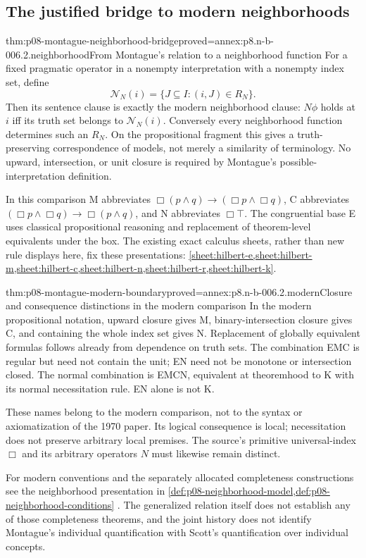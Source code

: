 \subsection{The justified bridge to modern neighborhoods}

\begin{hbtheorem}{thm:p08-montague-neighborhood-bridge}{proved=annex:p8.n-b-006.2.neighborhood}{From Montague's relation to a neighborhood function}
For a fixed pragmatic operator in a nonempty interpretation with a
nonempty index set, define
\[
 \mathcal N_N(i)=\{J\subseteq I:(i,J)\in R_N\}.
\]
Then its sentence clause is exactly the modern neighborhood clause:
\(N\phi\) holds at \(i\) iff its truth set belongs to
\(\mathcal N_N(i)\). Conversely every neighborhood function determines
such an \(R_N\). On the propositional fragment this gives a
truth-preserving correspondence of models, not merely a similarity
of terminology. No upward, intersection, or unit closure is required
by Montague's possible-interpretation definition.
\end{hbtheorem}

In this comparison M abbreviates
\(\Box(p\land q)\to(\Box p\land\Box q)\), C abbreviates
\((\Box p\land\Box q)\to\Box(p\land q)\), and N abbreviates
\(\Box\top\). The congruential base E uses classical propositional
reasoning and replacement of theorem-level equivalents under the box.
The existing exact calculus sheets, rather than new rule displays here,
fix these presentations:
\cref{sheet:hilbert-e,sheet:hilbert-m,sheet:hilbert-c,sheet:hilbert-n,sheet:hilbert-r,sheet:hilbert-k}.

\begin{hbtheorem}{thm:p08-montague-modern-boundary}{proved=annex:p8.n-b-006.2.modern}{Closure and consequence distinctions in the modern comparison}
In the modern propositional notation, upward closure gives M,
binary-intersection closure gives C, and containing the whole index set
gives N. Replacement of globally equivalent formulas follows already
from dependence on truth sets. The combination EMC is regular but
need not contain the unit; EN need not be monotone or intersection
closed. The normal combination is EMCN, equivalent at theoremhood
to K with its normal necessitation rule. EN alone is not K.

These names belong to the modern comparison, not to the syntax or
axiomatization of the 1970 paper. Its logical consequence is local;
necessitation does not preserve arbitrary local premises. The source's
primitive universal-index \(\Box\) and its arbitrary operators \(N\)
must likewise remain distinct.
\end{hbtheorem}

For modern conventions and the separately allocated completeness
constructions see the neighborhood presentation in
\cref{def:p08-neighborhood-model,def:p08-neighborhood-conditions}
\cite{Chellas1980,Pacuit2017}. The generalized relation itself does not
establish any of those completeness theorems, and the joint history
does not identify Montague's individual quantification with Scott's
quantification over individual concepts.
